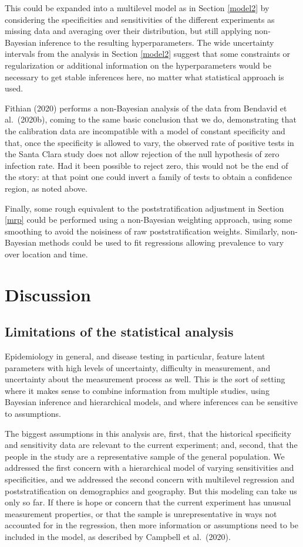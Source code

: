 \documentclass[11pt]{article}
\begin{document}
This could be expanded into a multilevel model as in Section
\ref{model2} by considering the specificities and sensitivities of the
different experiments as missing data and averaging over their
distribution, but still applying non-Bayesian inference to the
resulting hyperparameters.  The wide uncertainty intervals from the
analysis in Section \ref{model2} suggest that some constraints or
regularization or additional information on the hyperparameters would
be necessary to get stable inferences here, no matter what statistical
approach is used.

Fithian (2020) performs a non-Bayesian analysis of the data from
Bendavid et al.\ (2020b), coming to the same basic conclusion that we
do, demonstrating that the calibration data are incompatible with a
model of constant specificity and that, once the specificity is
allowed to vary, the observed rate of positive tests in the Santa
Clara study does not allow rejection of the null hypothesis of zero
infection rate.  Had it been possible to reject zero, this would not
be the end of the story: at that point one could invert a family of
tests to obtain a confidence region, as noted above.

Finally, some rough equivalent to the poststratification adjustment in
Section \ref{mrp} could be performed using a non-Bayesian weighting
approach, using some smoothing to avoid the noisiness of raw
poststratification weights.  Similarly, non-Bayesian methods could be
used to fit regressions allowing prevalence to vary over location and
time.


\section{Discussion}

\subsection{Limitations of the statistical analysis}

Epidemiology in general, and disease testing in particular, feature
latent parameters with high levels of uncertainty, difficulty in
measurement, and uncertainty about the measurement process as well.
This is the sort of setting where it makes sense to combine
information from multiple studies, using Bayesian inference and
hierarchical models, and where inferences can be sensitive to
assumptions.

The biggest assumptions in this analysis are, first, that the
historical specificity and sensitivity data are relevant to the
current experiment; and, second, that the people in the study are a
representative sample of the general population.  We addressed the
first concern with a hierarchical model of varying sensitivities and
specificities, and we addressed the second concern with multilevel
regression and poststratification on demographics and geography.  But
this modeling can take us only so far.  If there is hope or concern
that the current experiment has unusual measurement properties, or
that the sample is unrepresentative in ways not accounted for in the
regression, then more information or assumptions need to be included
in the model, as described by Campbell et al.\ (2020).
\end{document}

